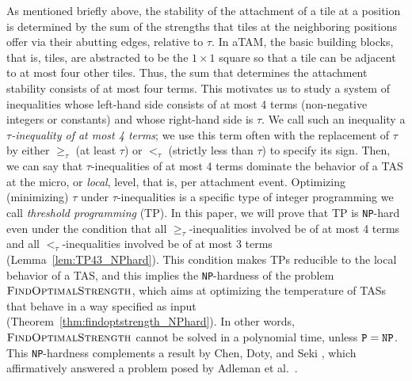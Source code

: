 \documentclass{article}
\theoremstyle{remark}
\theoremstyle{definition}
\newcommand{\findoptstrength}{\ensuremath{\mbox{\sc FindOptimalStrength}}}
\newcommand{\NP}{{\tt NP}}
\begin{document}
As mentioned briefly above, the stability of the attachment of a tile at a position is determined by the sum of the strengths that tiles at the neighboring positions offer via their abutting edges, relative to $\tau$. 
In aTAM, the basic building blocks, that is, tiles, are abstracted to be the $1 \times 1$ square so that a tile can be adjacent to at most four other tiles. 
Thus, the sum that determines the attachment stability consists of at most four terms. 
This motivates us to study a system of inequalities whose left-hand side consists of at most 4 terms (non-negative integers or constants) and whose right-hand side is $\tau$. 
We call such an inequality a {\it $\tau$-inequality of at most 4 terms}; we use this term often with the replacement of $\tau$ by either $\ge_\tau$ (at least $\tau$) or $<_\tau$ (strictly less than $\tau$) to specify its sign. 
Then, we can say that $\tau$-inequalities of at most 4 terms dominate the behavior of a TAS at the micro, or {\it local}, level, that is, per attachment event. 
Optimizing (minimizing) $\tau$ under $\tau$-inequalities is a specific type of integer programming we call {\it threshold programming} (TP). 
In this paper, we will prove that TP is \NP-hard even under the condition that all $\ge_\tau$-inequalities involved be of at most 4 terms and all $<_\tau$-inequalities involved be of at most 3 terms (Lemma~\ref{lem:TP43_NPhard}). 
This condition makes TPs reducible to the local behavior of a TAS, and this implies the \NP-hardness of the problem $\findoptstrength$, which aims at optimizing the temperature of TASs that behave in a way specified as input (Theorem~\ref{thm:findoptstrength_NPhard}). 
In other words, $\findoptstrength$ cannot be solved in a polynomial time, unless ${\tt P} = \NP$. 
This \NP-hardness complements a result by Chen, Doty, and Seki \cite{ChenDotySeki2011}, which affirmatively answered a problem posed by Adleman et al.~\cite{AdChGoHuKeEsRo2002}. 
\end{document}
